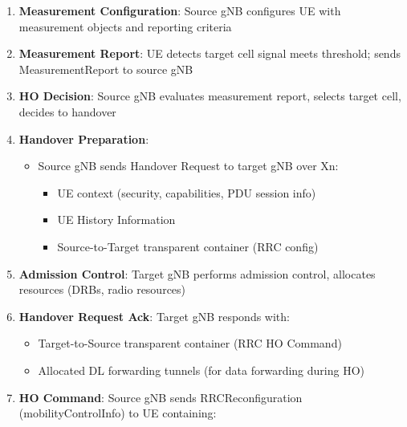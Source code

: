
\begin{enumerate}
\def\labelenumi{\arabic{enumi}.}
\tightlist
\item
  \textbf{Measurement Configuration}: Source gNB configures UE with measurement objects and reporting criteria
\item
  \textbf{Measurement Report}: UE detects target cell signal meets threshold; sends MeasurementReport to source gNB
\item
  \textbf{HO Decision}: Source gNB evaluates measurement report, selects target cell, decides to handover
\item
  \textbf{Handover Preparation}:

  \begin{itemize}
  \tightlist
  \item
    Source gNB sends Handover Request to target gNB over Xn:

    \begin{itemize}
    \tightlist
    \item
      UE context (security, capabilities, PDU session info)
    \item
      UE History Information
    \item
      Source-to-Target transparent container (RRC config)
    \end{itemize}
  \end{itemize}
\item
  \textbf{Admission Control}: Target gNB performs admission control, allocates resources (DRBs, radio resources)
\item
  \textbf{Handover Request Ack}: Target gNB responds with:

  \begin{itemize}
  \tightlist
  \item
    Target-to-Source transparent container (RRC HO Command)
  \item
    Allocated DL forwarding tunnels (for data forwarding during HO)
  \end{itemize}
\item
  \textbf{HO Command}: Source gNB sends RRCReconfiguration (mobilityControlInfo) to UE containing:


\end{enumerate}
